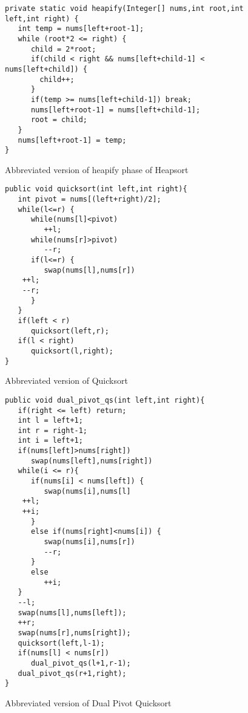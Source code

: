 \documentclass{article}
\begin{document}
\begin{figure}
\begin{lstlisting}
private static void heapify(Integer[] nums,int root,int left,int right) {
   int temp = nums[left+root-1];
   while (root*2 <= right) {
      child = 2*root;
      if(child < right && nums[left+child-1] < nums[left+child]) {
        child++;
      }
      if(temp >= nums[left+child-1]) break;
      nums[left+root-1] = nums[left+child-1];
      root = child;
   }
   nums[left+root-1] = temp;
}
\end{lstlisting}
\caption{Abbreviated version of heapify phase of Heapsort}
\end{figure}

\begin{figure}
\begin{lstlisting}
public void quicksort(int left,int right){
   int pivot = nums[(left+right)/2];
   while(l<=r) {
      while(nums[l]<pivot)
         ++l;
      while(nums[r]>pivot)
         --r;
      if(l<=r) {
         swap(nums[l],nums[r])
	++l;
	--r;
      }
   }
   if(left < r)
      quicksort(left,r);
   if(l < right)
      quicksort(l,right);
}
\end{lstlisting}
\caption{Abbreviated version of Quicksort}
\end{figure}

\begin{figure}
\begin{lstlisting}
public void dual_pivot_qs(int left,int right){
   if(right <= left) return;
   int l = left+1;
   int r = right-1;
   int i = left+1;
   if(nums[left]>nums[right])
      swap(nums[left],nums[right])
   while(i <= r){
      if(nums[i] < nums[left]) {
         swap(nums[i],nums[l]
	++l;
	++i;
      }
      else if(nums[right]<nums[i]) {
         swap(nums[i],nums[r])
         --r;
      }
      else
         ++i;
   }
   --l;
   swap(nums[l],nums[left]);
   ++r;
   swap(nums[r],nums[right]);
   quicksort(left,l-1);
   if(nums[l] < nums[r])
      dual_pivot_qs(l+1,r-1);
   dual_pivot_qs(r+1,right);
}
\end{lstlisting}
\caption{Abbreviated version of Dual Pivot Quicksort}
\end{figure}
\end{document}
